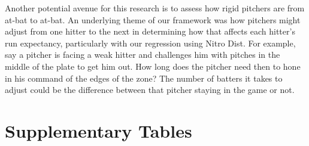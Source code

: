 \documentclass{article}
\newcommand{\tbl}[1]{}
\begin{document}
Another potential avenue for this research is to assess how rigid pitchers are from at-bat to at-bat. An underlying theme of our framework was how pitchers might adjust from one hitter to the next in determining how that affects each hitter's run expectancy, particularly with our regression using Nitro Dist. For example, say a pitcher is facing a weak hitter and challenges him with pitches in the middle of the plate to get him out. How long does the pitcher need then to hone in his command of the edges of the zone? The number of batters it takes to adjust could be the difference between that pitcher staying in the game or not.

\newpage



\appendix

\newpage
\section{Supplementary Tables}\label{app:tables}

\tbl{expected_signs_focal}
\tbl{expected_signs_cond}
\tbl{interaction_focal_2025}
\tbl{interaction_cond_2025}
\tbl{interaction_focal_2026}
\tbl{interaction_cond_2026}
\tbl{interaction_barrel_2025}
\tbl{interaction_barrel_2026}
\end{document}
